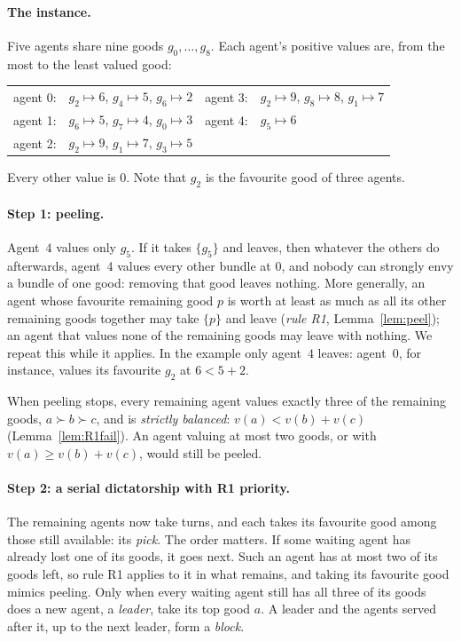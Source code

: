 \documentclass[runningheads,11pt]{llncs}
\begin{document}
\paragraph{The instance.} Five agents share nine goods $g_0,\dots,g_8$. Each agent's positive values are, from the most to the least valued good:
\begin{center}
\setlength{\tabcolsep}{4pt}\begin{tabular}{@{}l@{\ \ }l@{\qquad}l@{\ \ }l@{}}
agent 0: & $g_2\mapsto6$, $g_4\mapsto5$, $g_6\mapsto2$ & agent 3: & $g_2\mapsto9$, $g_8\mapsto8$, $g_1\mapsto7$ \\
agent 1: & $g_6\mapsto5$, $g_7\mapsto4$, $g_0\mapsto3$ & agent 4: & $g_5\mapsto6$ \\
agent 2: & $g_2\mapsto9$, $g_1\mapsto7$, $g_3\mapsto5$ & & \\
\end{tabular}
\end{center}
Every other value is $0$. Note that $g_2$ is the favourite good of three agents.

\paragraph{Step 1: peeling.} Agent~$4$ values only $g_5$. If it takes $\{g_5\}$ and leaves, then whatever the others do afterwards, agent~4 values every other bundle at $0$, and nobody can strongly envy a bundle of one good: removing that good leaves nothing. More generally, an agent whose favourite remaining good $p$ is worth at least as much as all its other remaining goods together may take $\{p\}$ and leave (\emph{rule R1}, Lemma~\ref{lem:peel}); an agent that values none of the remaining goods may leave with nothing. We repeat this while it applies. In the example only agent~$4$ leaves: agent~$0$, for instance, values its favourite $g_2$ at $6<5+2$.

When peeling stops, every remaining agent values exactly three of the remaining goods, $a\succ b\succ c$, and is \emph{strictly balanced}: $v(a)<v(b)+v(c)$ (Lemma~\ref{lem:R1fail}). An agent valuing at most two goods, or with $v(a)\ge v(b)+v(c)$, would still be peeled.

\paragraph{Step 2: a serial dictatorship with R1 priority.} The remaining agents now take turns, and each takes its favourite good among those still available: its \emph{pick}. The order matters. If some waiting agent has already lost one of its goods, it goes next. Such an agent has at most two of its goods left, so rule R1 applies to it in what remains, and taking its favourite good mimics peeling. Only when every waiting agent still has all three of its goods does a new agent, a \emph{leader}, take its top good $a$. A leader and the agents served after it, up to the next leader, form a \emph{block}.
\end{document}

